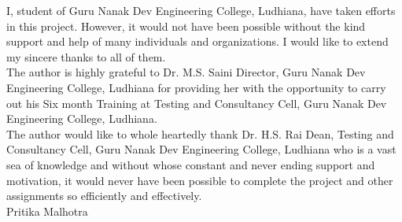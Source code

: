 \begin{Huge}
\end{Huge}

I, student of Guru Nanak Dev Engineering College, Ludhiana, have taken efforts in this project.
However, it would not have been possible without the kind support and help of many individuals
and organizations. I would like to extend my sincere thanks to all of them.\\

The author is highly grateful to Dr. M.S. Saini Director, Guru Nanak Dev Engineering College, Ludhiana for providing her with the opportunity to carry out his Six month Training at
Testing and Consultancy Cell, Guru Nanak Dev Engineering College, Ludhiana.\\

The author would like to whole heartedly thank Dr. H.S. Rai Dean, Testing and Consultancy
Cell, Guru Nanak Dev Engineering College, Ludhiana who is a vast sea of knowledge and without whose constant and never ending support and motivation, it would never have been possible to complete the project and other assignments so efficiently and effectively.\\

\vskip 1.0cm 
\noindent Pritika Malhotra
